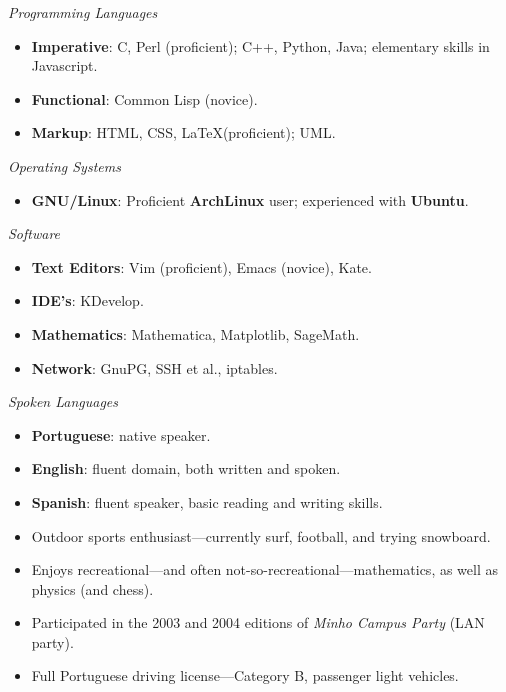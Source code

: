 \documentclass{article}
\newenvironment{topic}[1]
   {{\noindent\large\bfseries\raisebox{0pt}[\height][1ex]{#1}\hrule}%
    \begin{list}{}{%
       \setlength{\leftmargin}{.25cm}}%
    \item[]}
   {\end{list}\medskip}
\begin{document}
\begin{topic}{Technical Skills}
	{\itshape Programming Languages}  
	\begin{itemize}
		\item{\bfseries Imperative}: C, Perl (proficient); C++, Python, Java;
elementary skills in Javascript.
		\item{\bfseries Functional}: Common Lisp (novice).
		\item{\bfseries Markup}: HTML, CSS, \LaTeX (proficient); UML.
\end{itemize}
	{\itshape Operating Systems} 
  \begin{itemize}
		\item{\bfseries GNU/Linux}: Proficient \textbf{ArchLinux} user; experienced with \textbf{Ubuntu}.
	\end{itemize}
{\itshape Software}
  \begin{itemize}
\item{\bfseries Text Editors}: Vim (proficient), Emacs (novice), Kate.
\item{\bfseries IDE's}: KDevelop.
\item{\bfseries Mathematics}: Mathematica, Matplotlib, SageMath.
\item{\bfseries Network}: GnuPG, SSH et al., iptables.
  \end{itemize}
\end{topic}

\begin{topic}{Other Skills}
	{\itshape Spoken Languages} 
	\begin{itemize}
		\item {\bfseries Portuguese}: native speaker.
		\item {\bfseries English}: fluent domain, both written and spoken.
		\item {\bfseries Spanish}: fluent speaker, basic reading and writing skills.
	\end{itemize}
\end{topic}

\begin{topic}{Additional Information}
\begin{itemize}
\item{Outdoor sports enthusiast---currently surf, football, and trying
snowboard.}
\item{Enjoys recreational---and often not-so-recreational---mathematics,
as well as physics (and chess).}
\item{Participated in the 2003 and 2004 editions of \emph{Minho Campus
Party} (LAN party).}
\item{Full Portuguese driving license---Category B, passenger light
vehicles.}
\end{itemize}
\end{topic}
\end{document}
